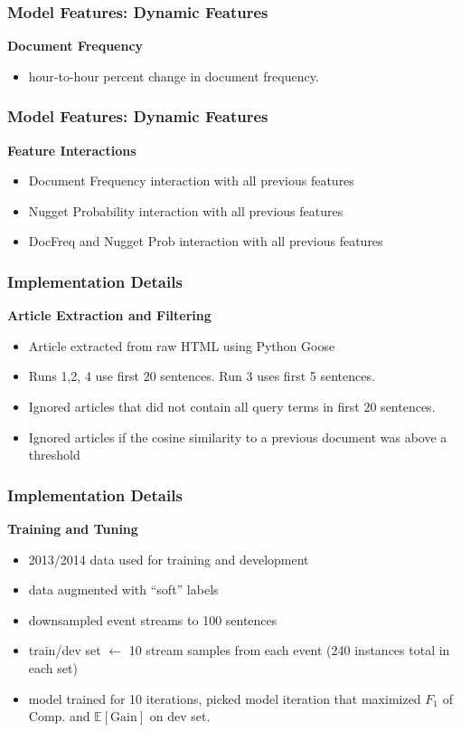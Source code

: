 \documentclass{beamer}
\begin{document}
\begin{frame}
    \frametitle{Model Features: Dynamic Features}
 \textbf{Document Frequency} 
 \begin{itemize}
    \item hour-to-hour percent change in document frequency. 
 \end{itemize}
\end{frame}

\begin{frame}
    \frametitle{Model Features: Dynamic Features}
 \textbf{Feature Interactions} 
    \begin{itemize}
        \item Document Frequency interaction with all previous features
        \item Nugget Probability interaction with all previous features
        \item DocFreq and Nugget Prob interaction with all previous features   
    \end{itemize}
\end{frame}


\begin{frame}
    \frametitle{Implementation Details}
\textbf{Article Extraction and Filtering}
    \begin{itemize}
        \item Article extracted from raw HTML using Python Goose
        \item Runs 1,2, 4 use first 20 sentences. Run 3 uses first 5 sentences.
        \item Ignored articles that did not contain all query terms in first 
            20 sentences.
        \item Ignored articles if the cosine similarity to a previous document 
            was above a threshold
    \end{itemize}
\end{frame}

\begin{frame}
    \frametitle{Implementation Details}
\textbf{Training and Tuning}
    \begin{itemize}
        \item 2013/2014 data used for training and development
        \item data augmented with ``soft'' labels
        \item downsampled event streams to 100 sentences
        \item train/dev set $\gets$ 10 stream samples from each event 
            (240 instances total in each set)
        \item model trained for 10 iterations, picked model iteration 
            that maximized $F_1$ of Comp. and $\mathbb{E[\mathrm{Gain}]}$ on
            dev set.
    \end{itemize}
\end{frame}
\end{document}
